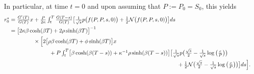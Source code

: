 \documentclass[openany,oneside]{article}
\theoremstyle{definition}
\theoremstyle{remark}
\newcommand{\ts}{\textstyle}
\begin{document}
{\[\]
In particular, at time $t=0$ and upon assuming that $P:=P_0=S_0$, this yields
\begin{align*}
 \ts r_0^* &\ts= \frac{G'(T)}{G(T)} x + \frac{P}{2\kappa}\int_t^T  \frac{G(T-s)}{G(T)} \bigl[ \frac{1}{\sqrt{s}}p\bigl(f(P,P,s,0)\bigr)+\frac{1}{2}\mathcal N\bigl(f(P,P,s,0)\bigr)\bigr] ds\\
           &\ts= \bigl[2\kappa\beta\cosh(\beta T)+2\rho\sinh(\beta T)\bigr]^{-1}\\
					 &\ts\hspace{1.5cm}\times\Bigl[ 2\bigl[\rho\beta\cosh(\beta T)+\phi\sinh(\beta T)\bigr] x\\
					 &\ts\hspace{2.5cm}+ P\int_t^T  \bigl[\beta\cosh(\beta (T-s))+\kappa^{-1}\rho\sinh(\beta (T-s))\bigr] \bigl[ \frac{1}{\sqrt{s}}p\bigl(\frac{\sqrt{s}}{2} - \frac{1}{\sqrt{s}}\log\left(\frac{c}{P}\right)\bigr)\\
					 &\ts\hspace{10.5cm}+\frac{1}{2}\mathcal N\bigl(\frac{\sqrt{s}}{2} - \frac{1}{\sqrt{s}}\log\left(\frac{c}{P}\right)\bigr)\bigr] ds\Bigr].
\end{align*}
}
\end{document}

